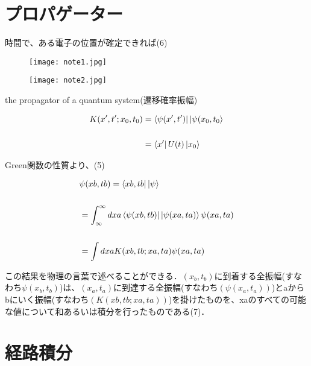 \documentclass[xelatex,ja=standard,jafont=noto]{bxjsarticle}
\begin{document}
\section{プロパゲーター}

時間で、ある電子の位置が確定できれば(6)

\begin{figure}[h!]
    \centering
    \texttt{[image: note1.jpg]}
    \caption{}
\end{figure}

\newpage

\begin{figure}[h!]
    \centering
    \texttt{[image: note2.jpg]}
    \caption{}
\end{figure}


the propagator of a quantum system(遷移確率振幅)

\begin{equation}
    \begin{aligned}
      K(x',t';x_{0},t_{0})&=\bra{\psi(x',t')}\ket{\psi(x_{0},t_{0}}\\
      \\
      &=\bra{x'}U(t)\ket{x_{0}}\\
    \end{aligned}
\end{equation}


Green関数の性質より、(5)

\begin{equation}
    \begin{aligned}
      &\psi(xb,tb)=\bra{xb,tb}\ket{\psi}\\
      \\
      &=\int_{\infty}^{\infty}dxa\bra{\psi(xb,tb)}\ket{\psi(xa,ta)}\psi(xa,ta)\\
      \\
      &=\int dxa K(xb,tb;xa,ta)\psi(xa,ta)\\
    \end{aligned}
\end{equation}

この結果を物理の言葉で述べることができる．$(x_{b},t_{b})$に到着する全振幅(すなわち$\psi(x_{b},t_{b})$)は、$(x_{a},t_{a})$に到達する全振幅(すなわち$(\psi(x_{a},t_{a}))$)とaからbにいく振幅(すなわち$(K(xb,tb;xa,ta))$)を掛けたものを、xaのすべての可能な値について和あるいは積分を行ったものである(7)．

\section{経路積分}
\end{document}
